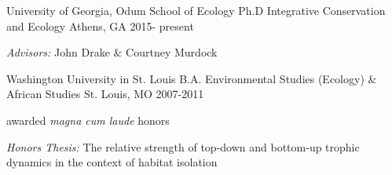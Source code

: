 

\begin{cventries}

  \cventry
  	{University of Georgia, Odum School of Ecology} %
    {Ph.D Integrative Conservation and Ecology} %
    {Athens, GA} %
    {2015- present} %
	{
      \begin{cvitems} %
      \item{\textit{Advisors:} John Drake \& Courtney Murdock}
      \end{cvitems}
    }

   \cventry
    {Washington University in St. Louis} %
    {B.A. Environmental Studies (Ecology) \& African Studies} %
    {St. Louis, MO} %
    {2007-2011} %
    {
      \begin{cvitems} %
      	\item {awarded \textit{magna cum laude} honors}
        \item { \textit{Honors Thesis:} The relative strength of top-down and bottom-up trophic dynamics in the context of habitat isolation}
      \end{cvitems}
    }

\end{cventries}
